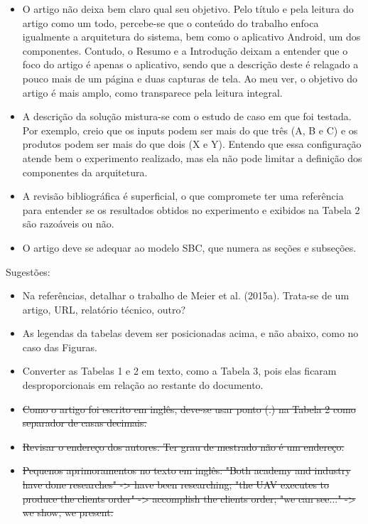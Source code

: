 \documentclass[12pt]{article}
\begin{document}
\begin{itemize}

\item O artigo não deixa bem claro qual seu objetivo. Pelo título e pela leitura do artigo como um todo, percebe-se que o conteúdo do trabalho enfoca igualmente a arquitetura do sistema, bem como o aplicativo Android, um dos componentes. Contudo, o Resumo e a Introdução deixam a entender que o foco do artigo é apenas o aplicativo, sendo que a descrição deste é relagado a pouco mais de um página e duas capturas de tela. Ao meu ver, o objetivo do artigo é mais amplo, como transparece pela leitura integral.

\item A descrição da solução mistura-se com o estudo de caso em que foi testada. Por exemplo, creio que os inputs podem ser mais do que três (A, B e C) e os produtos podem ser mais do que dois (X e Y). Entendo que essa configuração atende bem o experimento realizado, mas ela não pode limitar a definição dos componentes da arquitetura.

\item A revisão bibliográfica é superficial, o que compromete ter uma referência para entender se os resultados obtidos no experimento e exibidos na Tabela 2 são razoáveis ou não.

\item O artigo deve se adequar ao modelo SBC, que numera as seções e subseções.

\end{itemize}

Sugestões:

\begin{itemize}

\item Na referências, detalhar o trabalho de Meier et al. (2015a). Trata-se de um artigo, URL, relatório técnico, outro?

\item As legendas da tabelas devem ser posicionadas acima, e não abaixo, como no caso das Figuras.

\item Converter as Tabelas 1 e 2 em texto, como a Tabela 3, pois elas ficaram desproporcionais em relação ao restante do documento.

\item \sout{Como o artigo foi escrito em inglês, deve-se usar ponto (.) na Tabela 2 como separador de casas decimais.}

\item \sout{Revisar o endereço dos autores. Ter grau de mestrado não é um endereço.}

\item \sout{Pequenos aprimoramentos no texto em inglês: "Both academy and industry have done researches" -> have been researching; "the UAV executes to produce the clients order" -> accomplish the clients order; "we can see..." -> we show, we present.}

\end{itemize}
\end{document}
